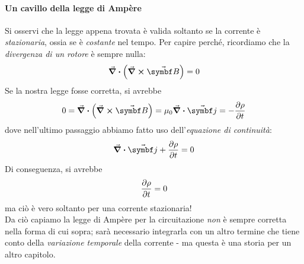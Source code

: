 \paragraph{Un cavillo della legge di Ampère}

Si osservi che la legge appena trovata è valida soltanto se la corrente è \textit{stazionaria}, ossia se è \textit{costante} nel tempo. Per capire perché, ricordiamo che la \textit{divergenza di un rotore} è sempre nulla:\label{laleggediAmpereèfalsaepretenziosa}
\begin{equation*}
	\div{\left(\curl{\vba{B}}\right)}=0
\end{equation*}
Se la nostra legge fosse corretta, si avrebbe
\begin{equation*}
	0=\div{\left(\curl{\vba{B}}\right)}=\mu_0\div{\vba{j}}=-\pdv{\rho}{t}
\end{equation*}
dove nell'ultimo passaggio abbiamo fatto uso dell'\textit{equazione di continuità}:
\begin{equation*}
	\div{\vba{j}}+\pdv{\rho}{t}=0
\end{equation*}
Di conseguenza, si avrebbe
\begin{equation*}
	\pdv{\rho}{t}=0
\end{equation*}
ma ciò è vero soltanto per una corrente stazionaria!\\
Da ciò capiamo la legge di Ampère per la circuitazione \textit{non} è sempre corretta nella forma di cui sopra; sarà necessario integrarla con un altro termine che tiene conto della \textit{variazione temporale} della corrente - ma questa è una storia per un altro capitolo.
